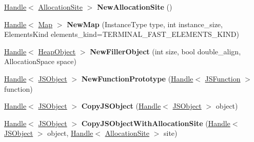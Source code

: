 \begin{DoxyCompactItemize}
\item 
\hypertarget{classv8_1_1internal_1_1_v8___f_i_n_a_l_adbb206aac2e8749abcbee77c683ffabb}{}\hyperlink{classv8_1_1internal_1_1_handle}{Handle}$<$ \hyperlink{classv8_1_1internal_1_1_allocation_site}{Allocation\+Site} $>$ {\bfseries New\+Allocation\+Site} ()\label{classv8_1_1internal_1_1_v8___f_i_n_a_l_adbb206aac2e8749abcbee77c683ffabb}

\item 
\hypertarget{classv8_1_1internal_1_1_v8___f_i_n_a_l_ab1a1c1ed22e33276deeabc8f3eec4382}{}\hyperlink{classv8_1_1internal_1_1_handle}{Handle}$<$ \hyperlink{classv8_1_1internal_1_1_map}{Map} $>$ {\bfseries New\+Map} (Instance\+Type type, int instance\+\_\+size, Elements\+Kind elements\+\_\+kind=T\+E\+R\+M\+I\+N\+A\+L\+\_\+\+F\+A\+S\+T\+\_\+\+E\+L\+E\+M\+E\+N\+T\+S\+\_\+\+K\+I\+N\+D)\label{classv8_1_1internal_1_1_v8___f_i_n_a_l_ab1a1c1ed22e33276deeabc8f3eec4382}

\item 
\hypertarget{classv8_1_1internal_1_1_v8___f_i_n_a_l_a5353170ad1d012789c2e787b1b4d03e8}{}\hyperlink{classv8_1_1internal_1_1_handle}{Handle}$<$ \hyperlink{classv8_1_1internal_1_1_heap_object}{Heap\+Object} $>$ {\bfseries New\+Filler\+Object} (int size, bool double\+\_\+align, Allocation\+Space space)\label{classv8_1_1internal_1_1_v8___f_i_n_a_l_a5353170ad1d012789c2e787b1b4d03e8}

\item 
\hypertarget{classv8_1_1internal_1_1_v8___f_i_n_a_l_a88d35940765aa582a96b8c29c80b8f5b}{}\hyperlink{classv8_1_1internal_1_1_handle}{Handle}$<$ \hyperlink{classv8_1_1internal_1_1_j_s_object}{J\+S\+Object} $>$ {\bfseries New\+Function\+Prototype} (\hyperlink{classv8_1_1internal_1_1_handle}{Handle}$<$ \hyperlink{classv8_1_1internal_1_1_j_s_function}{J\+S\+Function} $>$ function)\label{classv8_1_1internal_1_1_v8___f_i_n_a_l_a88d35940765aa582a96b8c29c80b8f5b}

\item 
\hypertarget{classv8_1_1internal_1_1_v8___f_i_n_a_l_a80661e203bca58c8657cbe21ab429884}{}\hyperlink{classv8_1_1internal_1_1_handle}{Handle}$<$ \hyperlink{classv8_1_1internal_1_1_j_s_object}{J\+S\+Object} $>$ {\bfseries Copy\+J\+S\+Object} (\hyperlink{classv8_1_1internal_1_1_handle}{Handle}$<$ \hyperlink{classv8_1_1internal_1_1_j_s_object}{J\+S\+Object} $>$ object)\label{classv8_1_1internal_1_1_v8___f_i_n_a_l_a80661e203bca58c8657cbe21ab429884}

\item 
\hypertarget{classv8_1_1internal_1_1_v8___f_i_n_a_l_a019fb2906422f21e8d860a6f65cd197e}{}\hyperlink{classv8_1_1internal_1_1_handle}{Handle}$<$ \hyperlink{classv8_1_1internal_1_1_j_s_object}{J\+S\+Object} $>$ {\bfseries Copy\+J\+S\+Object\+With\+Allocation\+Site} (\hyperlink{classv8_1_1internal_1_1_handle}{Handle}$<$ \hyperlink{classv8_1_1internal_1_1_j_s_object}{J\+S\+Object} $>$ object, \hyperlink{classv8_1_1internal_1_1_handle}{Handle}$<$ \hyperlink{classv8_1_1internal_1_1_allocation_site}{Allocation\+Site} $>$ site)\label{classv8_1_1internal_1_1_v8___f_i_n_a_l_a019fb2906422f21e8d860a6f65cd197e}


\end{DoxyCompactItemize}
